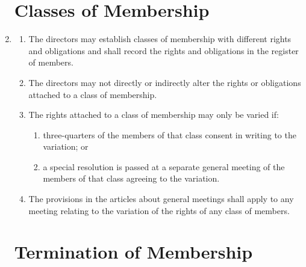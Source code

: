 \begin{enumerate}
\section{Classes of Membership}

\item
  \label{cls:members}
  \begin{enumerate}
  \item
    The directors may establish classes of membership with different
    rights and obligations and shall record the rights and obligations
    in the register of members.
  \item
    The directors may not directly or indirectly alter the rights or
    obligations attached to a class of membership.
  \item
    The rights attached to a class of membership may only be varied if:
    \begin{enumerate}
    \item
      three-quarters of the members of that class consent in writing to
      the variation; or
    \item
      a special resolution is passed at a separate general meeting of the
      members of that class agreeing to the variation.
    \end{enumerate}
  \item
    The provisions in the articles about general meetings shall apply
    to any meeting relating to the variation of the rights of any class
    of members.
  \end{enumerate}

\section{Termination of Membership}


\end{enumerate}
